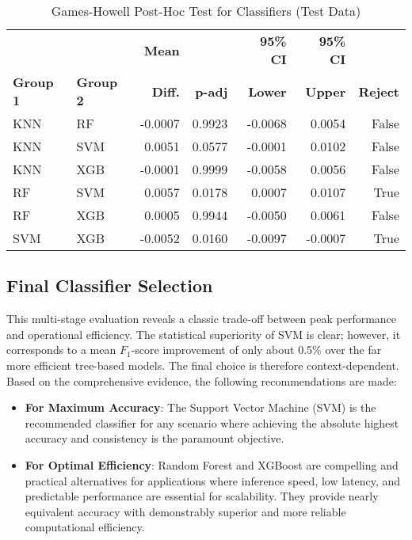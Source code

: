 \begin{table}[tb]
    \captionsetup{skip=5pt}
\centering
\caption{Games-Howell Post-Hoc Test for Classifiers (Test Data)}
\label{tbl:games_howell_classifier_full}
        \begin{tabular}{llrrrrr}
            \toprule
             &  & \textbf{Mean} &  & \textbf{95\% CI} & \textbf{95\% CI} & \\
            \textbf{Group 1} & \textbf{Group 2} & \textbf{Diff.} & \textbf{p-adj} & \textbf{Lower} & \textbf{Upper} & \textbf{Reject}\\
\midrule
KNN & RF & -0.0007 & 0.9923 & -0.0068 & 0.0054 & False \\
KNN & SVM & 0.0051 & 0.0577 & -0.0001 & 0.0102 & False \\
KNN & XGB & -0.0001 & 0.9999 & -0.0058 & 0.0056 & False \\
RF & SVM & 0.0057 & 0.0178 & 0.0007 & 0.0107 & True \\
RF & XGB & 0.0005 & 0.9944 & -0.0050 & 0.0061 & False \\
SVM & XGB & -0.0052 & 0.0160 & -0.0097 & -0.0007 & True \\
\bottomrule
\end{tabular}
\end{table}

\subsection{Final Classifier Selection}\label{ch:4.5.4}
This multi-stage evaluation reveals a classic trade-off between peak performance and operational efficiency. The statistical superiority of SVM is clear; however, it corresponds to a mean \(F_1\)-score improvement of only about 0.5\% over the far more efficient tree-based models. The final choice is therefore context-dependent. Based on the comprehensive evidence, the following recommendations are made:
\begin{itemize}
    \item \textbf{For Maximum Accuracy}: The Support Vector Machine (SVM) is the recommended classifier for any scenario where achieving the absolute highest accuracy and consistency is the paramount objective.
    \item \textbf{For Optimal Efficiency}: Random Forest and XGBoost are compelling and practical alternatives for applications where inference speed, low latency, and predictable performance are essential for scalability. They provide nearly equivalent accuracy with demonstrably superior and more reliable computational efficiency.
\end{itemize}


